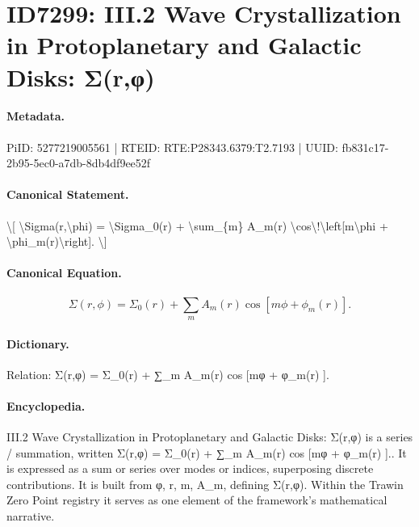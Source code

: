 \section*{ID7299: III.2 Wave Crystallization in Protoplanetary and Galactic Disks: Σ(r,φ)}
\paragraph{Metadata.}
PiID: 5277219005561 | RTEID: RTE:P28343.6379:T2.7193 | UUID: fb831c17-2b95-5ec0-a7db-8db4df9ee52f

\paragraph{Canonical Statement.}
\textbackslash{}[ \textbackslash{}Sigma(r,\textbackslash{}phi) = \textbackslash{}Sigma\_0(r) + \textbackslash{}sum\_\{m\} A\_m(r) \textbackslash{}cos\textbackslash{}!\textbackslash{}left[m\textbackslash{}phi + \textbackslash{}phi\_m(r)\textbackslash{}right]. \textbackslash{}]

\paragraph{Canonical Equation.}
\[
\Sigma(r,\phi) = \Sigma_0(r) + \sum_{m} A_m(r) \cos\!\left[m\phi + \phi_m(r)\right].
\]

\paragraph{Dictionary.}
Relation: Σ(r,φ) = Σ\_0(r) + ∑\_m A\_m(r) cos [mφ + φ\_m(r) ].

\paragraph{Encyclopedia.}
III.2 Wave Crystallization in Protoplanetary and Galactic Disks: Σ(r,φ) is a series / summation, written Σ(r,φ) = Σ\_0(r) + ∑\_m A\_m(r) cos [mφ + φ\_m(r) ].. It is expressed as a sum or series over modes or indices, superposing discrete contributions. It is built from φ, r, m, A\_m, defining Σ(r,φ). Within the Trawin Zero Point registry it serves as one element of the framework's mathematical narrative.
